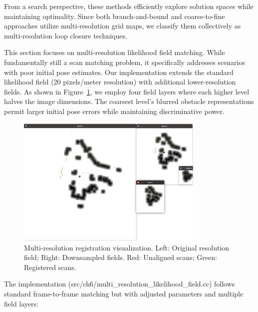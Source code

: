 From a search perspective, these methods efficiently explore solution spaces while maintaining optimality. Since both branch-and-bound and coarse-to-fine approaches utilize multi-resolution grid maps, we classify them collectively as multi-resolution loop closure techniques.  

This section focuses on multi-resolution likelihood field matching. While fundamentally still a scan matching problem, it specifically addresses scenarios with poor initial pose estimates. Our implementation extends the standard likelihood field (20 pixels/meter resolution) with additional lower-resolution fields. As shown in Figure~\ref{fig:multi-level-search}, we employ four field layers where each higher level halves the image dimensions. The coarsest level's blurred obstacle representations permit larger initial pose errors while maintaining discriminative power.  

\begin{figure}[!t]  
	\centering  
	\includegraphics[width=0.8\textwidth]{resources/2d-lidar-mapping/multi-level-search.png}  
	\caption{Multi-resolution registration visualization. Left: Original resolution field; Right: Downsampled fields. Red: Unaligned scans; Green: Registered scans.}  
	\label{fig:multi-level-search}  
\end{figure}  

The implementation (src/ch6/multi\_resolution\_likelihood\_field.cc) follows standard frame-to-frame matching but with adjusted parameters and multiple field layers:  

